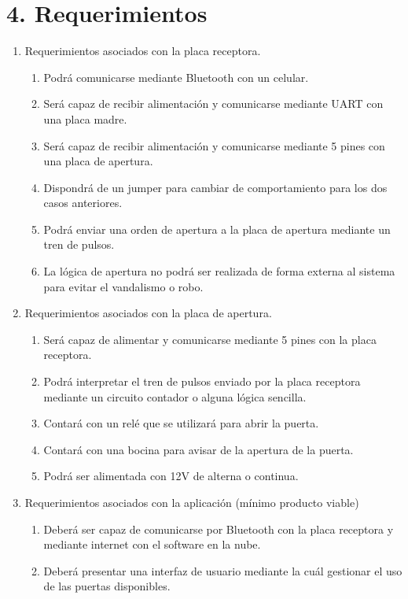 \documentclass[11pt]{charter}
\begin{document}
\section{4. Requerimientos}
\label{sec:requerimientos}


\begin{enumerate}
\item Requerimientos asociados con la placa receptora.
	\begin{enumerate}
	\item Podrá comunicarse mediante Bluetooth con un celular.
	\item Será capaz de recibir alimentación y comunicarse mediante UART con una placa madre.
	\item Será capaz de recibir alimentación y comunicarse mediante 5 pines con una placa de apertura.
	\item Dispondrá de un jumper para cambiar de comportamiento para los dos casos anteriores.
	\item Podrá enviar una orden de apertura a la placa de apertura mediante un tren de pulsos.
	\item La lógica de apertura no podrá ser realizada de forma externa al sistema para evitar el vandalismo o robo.
	\end{enumerate}
\item Requerimientos asociados con la placa de apertura.
	\begin{enumerate}
	\item Será capaz de alimentar y comunicarse mediante 5 pines con la placa receptora.
	\item Podrá interpretar el tren de pulsos enviado por la placa receptora mediante un circuito contador o alguna lógica sencilla.
	\item Contará con un relé que se utilizará para abrir la puerta.
	\item Contará con una bocina para avisar de la apertura de la puerta.
	\item Podrá ser alimentada con 12V de alterna o continua.
	\end{enumerate}
\item Requerimientos asociados con la aplicación (mínimo producto viable)
	\begin{enumerate}
	\item Deberá ser capaz de comunicarse por Bluetooth con la placa receptora y mediante internet con el software en la nube.
	\item Deberá presentar una interfaz de usuario mediante la cuál gestionar el uso de las puertas disponibles.

\end{enumerate}
\end{enumerate}
\end{document}
